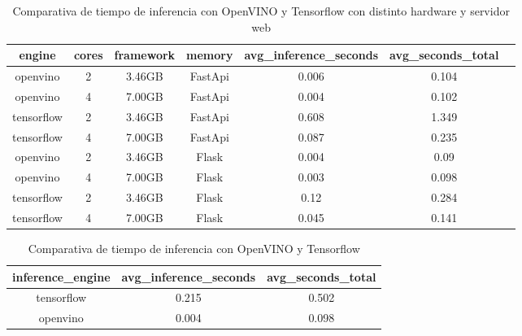 \begin{table}[ht]
    \begin{center}
        \small
        \begin{tabular}{ | c | c | c | c| c | c | c |}
            \hline
            engine & cores & framework & memory & avg\_inference\_seconds & avg\_seconds\_total \\ \hline
            openvino & 2 & 3.46GB & FastApi & 0.006 & 0.104 \\
            openvino & 4 & 7.00GB & FastApi & 0.004 & 0.102 \\
            tensorflow & 2 & 3.46GB & FastApi & 0.608 & 1.349 \\
            tensorflow & 4 & 7.00GB & FastApi & 0.087 & 0.235 \\
            openvino & 2 & 3.46GB & Flask & 0.004 & 0.09 \\
            openvino & 4 & 7.00GB & Flask & 0.003 & 0.098 \\
            tensorflow & 2 & 3.46GB & Flask & 0.12 & 0.284 \\
            tensorflow & 4 & 7.00GB & Flask & 0.045 & 0.141 \\ \hline
        \end{tabular}
    \end{center}
    \caption{Comparativa de tiempo de inferencia con OpenVINO y Tensorflow con distinto hardware y servidor web}
    \label{tab:Comparativa de tiempo de inferencia con OpenVINO y Tensorflow con distinto hardware y servidor web}
\end{table}


\begin{table}[ht]
    \begin{center}
        \begin{tabular}{| c | c | c |}
            \hline
            inference\_engine & avg\_inference\_seconds & avg\_seconds\_total \\ \hline
            tensorflow & 0.215 & 0.502 \\
            openvino & 0.004 & 0.098 \\ \hline
        \end{tabular}
        \caption{Comparativa de tiempo de inferencia con OpenVINO y Tensorflow}
        \label{tab:Comparativa de tiempo de inferencia con OpenVINO y Tensorflow}
    \end{center}
\end{table}

